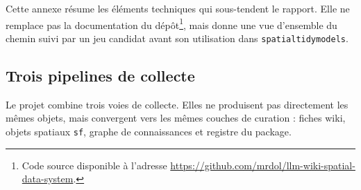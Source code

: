 \documentclass[11pt,a4paper]{article}
\begin{document}
Cette annexe résume les éléments techniques qui sous-tendent le rapport. Elle ne remplace pas la documentation du dépôt\footnote{Code source disponible à l'adresse \url{https://github.com/mrdol/llm-wiki-spatial-data-system}.}, mais donne une vue d'ensemble du chemin suivi par un jeu candidat avant son utilisation dans \texttt{spatialtidymodels}.

\subsection{Trois pipelines de collecte}

Le projet combine trois voies de collecte. Elles ne produisent pas directement les mêmes objets, mais convergent vers les mêmes couches de curation : fiches wiki, objets spatiaux \texttt{sf}, graphe de connaissances et registre du package.
\end{document}
